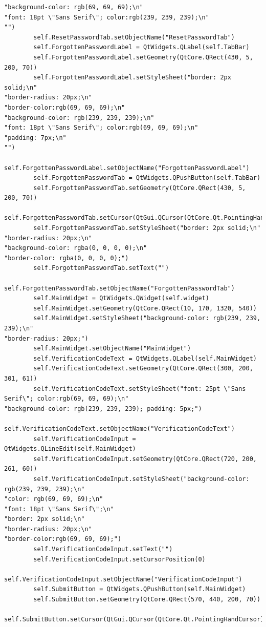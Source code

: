 \documentclass{article}
\begin{document}
\begin{lstlisting}
"background-color: rgb(69, 69, 69);\n"
"font: 18pt \"Sans Serif\"; color:rgb(239, 239, 239);\n"
"")
        self.ResetPasswordTab.setObjectName("ResetPasswordTab")
        self.ForgottenPasswordLabel = QtWidgets.QLabel(self.TabBar)
        self.ForgottenPasswordLabel.setGeometry(QtCore.QRect(430, 5, 200, 70))
        self.ForgottenPasswordLabel.setStyleSheet("border: 2px solid;\n"
"border-radius: 20px;\n"
"border-color:rgb(69, 69, 69);\n"
"background-color: rgb(239, 239, 239);\n"
"font: 18pt \"Sans Serif\"; color:rgb(69, 69, 69);\n"
"padding: 7px;\n"
"")
        self.ForgottenPasswordLabel.setObjectName("ForgottenPasswordLabel")
        self.ForgottenPasswordTab = QtWidgets.QPushButton(self.TabBar)
        self.ForgottenPasswordTab.setGeometry(QtCore.QRect(430, 5, 200, 70))
        self.ForgottenPasswordTab.setCursor(QtGui.QCursor(QtCore.Qt.PointingHandCursor))
        self.ForgottenPasswordTab.setStyleSheet("border: 2px solid;\n"
"border-radius: 20px;\n"
"background-color: rgba(0, 0, 0, 0);\n"
"border-color: rgba(0, 0, 0, 0);")
        self.ForgottenPasswordTab.setText("")
        self.ForgottenPasswordTab.setObjectName("ForgottenPasswordTab")
        self.MainWidget = QtWidgets.QWidget(self.widget)
        self.MainWidget.setGeometry(QtCore.QRect(10, 170, 1320, 540))
        self.MainWidget.setStyleSheet("background-color: rgb(239, 239, 239);\n"
"border-radius: 20px;")
        self.MainWidget.setObjectName("MainWidget")
        self.VerificationCodeText = QtWidgets.QLabel(self.MainWidget)
        self.VerificationCodeText.setGeometry(QtCore.QRect(300, 200, 301, 61))
        self.VerificationCodeText.setStyleSheet("font: 25pt \"Sans Serif\"; color:rgb(69, 69, 69);\n"
"background-color: rgb(239, 239, 239); padding: 5px;")
        self.VerificationCodeText.setObjectName("VerificationCodeText")
        self.VerificationCodeInput = QtWidgets.QLineEdit(self.MainWidget)
        self.VerificationCodeInput.setGeometry(QtCore.QRect(720, 200, 261, 60))
        self.VerificationCodeInput.setStyleSheet("background-color: rgb(239, 239, 239);\n"
"color: rgb(69, 69, 69);\n"
"font: 18pt \"Sans Serif\";\n"
"border: 2px solid;\n"
"border-radius: 20px;\n"
"border-color:rgb(69, 69, 69);")
        self.VerificationCodeInput.setText("")
        self.VerificationCodeInput.setCursorPosition(0)
        self.VerificationCodeInput.setObjectName("VerificationCodeInput")
        self.SubmitButton = QtWidgets.QPushButton(self.MainWidget)
        self.SubmitButton.setGeometry(QtCore.QRect(570, 440, 200, 70))
        self.SubmitButton.setCursor(QtGui.QCursor(QtCore.Qt.PointingHandCursor))

\end{lstlisting}
\end{document}

